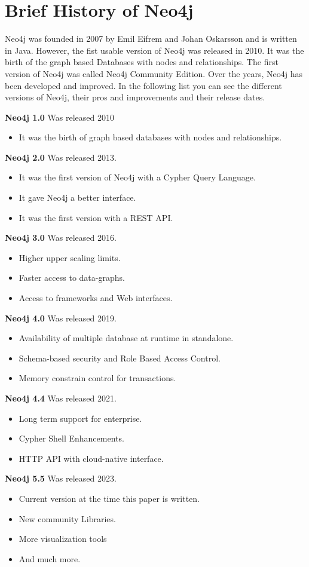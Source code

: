 
\section{Brief History of Neo4j} \label{sec:history}
Neo4j was founded in 2007 by Emil Eifrem and Johan Oskarsson and is written in Java.
However, the fist usable version of Neo4j was released in 2010.
It was the birth of the graph based Databases with nodes and relationships.
The first version of Neo4j was called Neo4j Community Edition.
Over the years, Neo4j has been developed and improved.
In the following list you can see the different versions of Neo4j, their pros and improvements and their release dates.

\textbf{Neo4j 1.0} Was released 2010
\begin{itemize}
    \item It was the birth of graph based databases with nodes and relationships.
\end{itemize}
\textbf{Neo4j 2.0} Was released 2013.
\begin{itemize}
    \item It was the first version of Neo4j with a Cypher Query Language.
    \item It gave Neo4j a better interface.
    \item It was the first version with a REST API.
\end{itemize}
\textbf{Neo4j 3.0} Was released 2016.
\begin{itemize}
    \item Higher upper scaling limits.
    \item Faster access to data-graphs.
    \item Access to frameworks and Web interfaces.
\end{itemize}
\textbf{Neo4j 4.0} Was released 2019.
\begin{itemize}
    \item Availability of multiple database at runtime in standalone.
    \item Schema-based security and Role Based Access Control.
    \item Memory constrain control for transactions.
\end{itemize}
\textbf{Neo4j 4.4} Was released 2021.
\begin{itemize}
    \item Long term support for enterprise.
    \item Cypher Shell Enhancements.
    \item HTTP API with cloud-native interface.
\end{itemize}
\textbf{Neo4j 5.5} Was released 2023.
\begin{itemize}
    \item Current version at the time this paper is written.
    \item New community Libraries.
    \item More visualization tools
    \item And much more.
\end{itemize}
